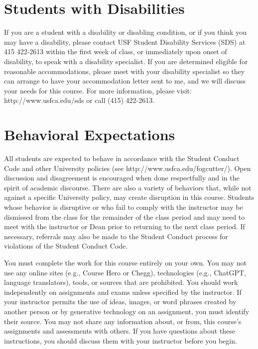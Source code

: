 \documentclass[10pt, oneside]{article}
\begin{document}
\section*{Students with Disabilities}
If you are a student with a disability or disabling condition, or if you think you may have a disability, please contact USF Student Disability Services (SDS) at 415 422-2613 within the first week of class, or immediately upon onset of disability, to speak with a disability specialist. If you are determined eligible for reasonable accommodations, please meet with your disability specialist so they can arrange to have your accommodation letter sent to me, and we will discuss your needs for this course. For more information, please visit: http://www.usfca.edu/sds or call (415) 422-2613.

\section*{Behavioral Expectations}
All students are expected to behave in accordance with the Student Conduct Code and other University policies (see http://www.usfca.edu/fogcutter/). Open discussion and disagreement is encouraged when done respectfully and in the spirit of academic discourse. There are also a variety of behaviors that, while not against a specific University policy, may create disruption in this course. Students whose behavior is disruptive or who fail to comply with the instructor may be dismissed from the class for the remainder of the class period and may need to meet with the instructor or Dean prior to returning to the next class period. If necessary, referrals may also be made to the Student Conduct process for violations of the Student Conduct Code.

You must complete the work for this course entirely on your own. You may not use any online sites (e.g., Course Hero or Chegg), technologies (e.g., ChatGPT, language translators), tools, or sources that are prohibited. You should work independently on assignments and exams unless specified by the instructor. If your instructor permits the use of ideas, images, or word phrases created by another person or by generative technology on an assignment, you must identify their source. You may not share any information about, or from, this course's assignments and assessments with others. If you have questions about these instructions, you should discuss them with your instructor before you begin.
\end{document}

